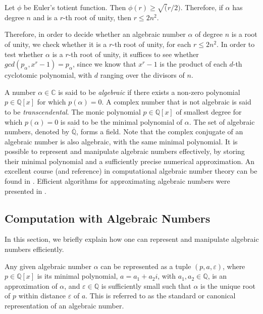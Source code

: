 \begin{lemma}
Let $\phi$ be Euler's totient function. Then $\phi(r)\geq\sqrt(r/2)$. Therefore, if $\alpha$ has degree $n$ and is a $r$-th root of unity, then $r\leq 2n^2$.
\end{lemma}

Therefore, in order to decide whether an algebraic number $\alpha$ of degree $n$ is a root of unity, we check whether it is a $r$-th root of unity, for each $r\leq 2n^2$. In order to test whether $\alpha$ is a $r$-th root of unity, it suffices to see whether $\mathit{gcd}(p_\alpha,x^r-1)=p_\alpha$, since we know that $x^r-1$ is the product of each $d$-th cyclotomic polynomial, with $d$ ranging over the divisors of $n$.


A number $\alpha \in \mathbb{C}$ is said to be \emph{algebraic} if
there exists a non-zero polynomial $p \in \mathbb{Q}[x]$ for which
$p(\alpha) = 0$. A complex number that is not algebraic is said to be
\emph{transcendental}. The monic polynomial $p \in \mathbb{Q}[x]$ of
smallest degree for which $p(\alpha) = 0$ is said to be the minimal
polynomial of $\alpha$. The set of algebraic numbers, denoted by
$\overline{\mathbb{Q}}$, forms a field. Note that the complex
conjugate of an algebraic number is also algebraic, with the same
minimal polynomial. It is possible to represent and manipulate
algebraic numbers effectively, by storing their minimal polynomial and
a sufficiently precise numerical approximation. An excellent course
(and reference) in computational algebraic number theory can be found
in \cite{Cohen}. Efficient algorithms for approximating algebraic
numbers were presented in \cite{Pan}.

\subsection{Computation with Algebraic Numbers}

In this section, we briefly explain how one can represent and manipulate algebraic numbers efficiently.

Any given algebraic number $\alpha$ can be represented as a tuple
$(p,a,\varepsilon)$, where $p\in\mathbb{Q}[x]$ is its minimal
polynomial, $a=a_1+a_2i$, with $a_1,a_2\in\mathbb{Q}$, is an
approximation of $\alpha$, and $\varepsilon \in \mathbb{Q}$ is
sufficiently small such that $\alpha$ is the unique root of $p$ within
distance $\varepsilon$ of $a$.  This is referred to as the standard or
canonical representation of an algebraic number.

